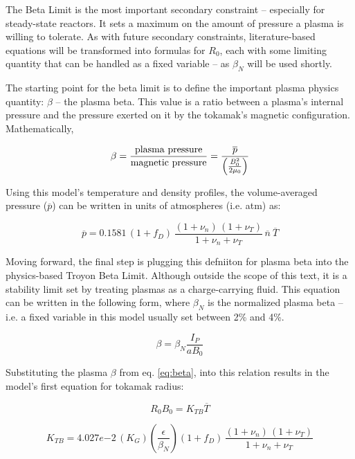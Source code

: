 \documentclass[11pt]{book}
\begin{document}
The Beta Limit is the most important secondary constraint -- especially for steady-state reactors. It sets a maximum on the amount of pressure a plasma is willing to tolerate. As with future secondary constraints, literature-based equations will be transformed into formulas for $R_0$, each with some limiting quantity that can be handled as a fixed variable -- as $\beta_N$ will be used shortly.

The starting point for the beta limit is to define the important plasma physics quantity: $\beta$ -- the plasma beta. This value is a ratio between a plasma's internal pressure and the pressure exerted on it by the tokamak's magnetic configuration. Mathematically,

\begin{equation}
	\label{eq:beta}
	\beta = \frac{\textnormal{plasma pressure}}{\textnormal{magnetic pressure}} = \frac{ \overline p }{ \left( \frac{B_0^2}{2 \mu_0} \right) }
\end{equation}

Using this model's temperature and density profiles, the volume-averaged pressure ($\overline p$) can be written in units of atmospheres (i.e. atm) as:

\begin{equation}
  \overline{p} = 0.1581 \, ( 1 + f_D ) \, \frac{ (1 + \nu_n) \, (1 + \nu_T) }{1 + \nu_n + \nu_T } \, \overline{n} \ \overline{T}
\end{equation}

Moving forward, the final step is plugging this defniiton for plasma beta into the physics-based Troyon Beta Limit. Although outside the scope of this text, it is a stability limit set by treating plasmas as a charge-carrying fluid. This equation can be written in the following form, where $\beta_N$ is the normalized plasma beta -- i.e. a fixed variable in this model usually set between 2\% and 4\%.

\begin{equation}
	\beta = \beta_N \frac{ I_P }{ a B_0 }
\end{equation}

Substituting the plasma $\beta$ from eq. \ref{eq:beta}, into this relation results in the model's first equation for tokamak radius:

\begin{equation}
  R_0 B_0 = K_{TB} \overline{T} 
\end{equation}

\begin{equation}
  K_{TB} = 4.027e{-2} \, ( K_G ) \left( \frac{\epsilon}{\beta_N} \right)  ( 1 + f_D ) \, \frac{ (1 + \nu_n) \, (1 + \nu_T) }{1 + \nu_n + \nu_T }
\end{equation}
\end{document}
